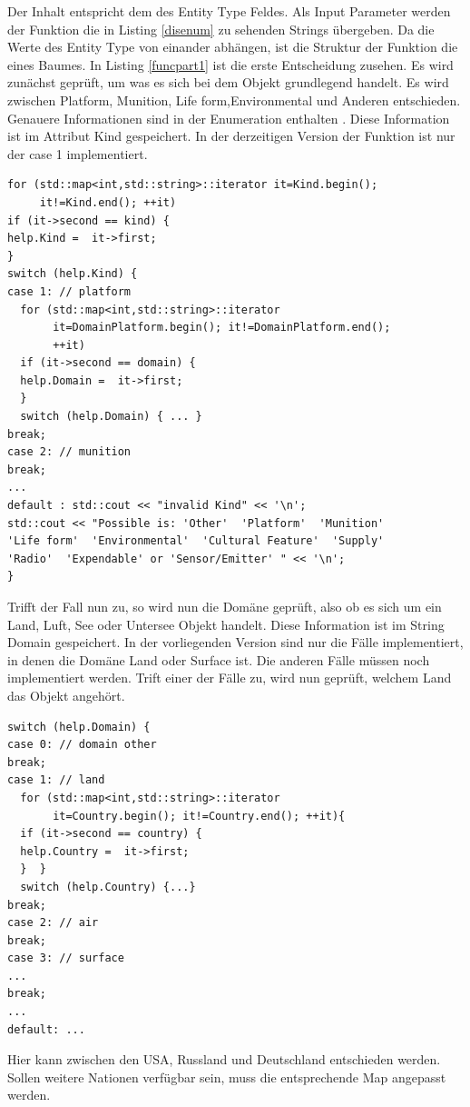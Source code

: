 Der Inhalt entspricht dem  des \glqq Entity Type\grqq{} Feldes. Als Input Parameter werden der Funktion die in Listing  \ref{disenum} zu sehenden Strings übergeben. Da die Werte des \glqq Entity Type\grqq{}  von einander abhängen, ist die Struktur der Funktion die eines Baumes.  In Listing \ref{funcpart1} ist die erste Entscheidung zusehen. Es wird zunächst geprüft, um was es sich bei dem Objekt grundlegend handelt. Es wird zwischen \glqq Platform\grqq{}, \glqq Munition\grqq{}, \glqq Life form\grqq{},\glqq Environmental\grqq{} und Anderen entschieden. Genauere Informationen sind in der Enumeration enthalten \cite{Shanks.}. Diese Information ist im Attribut \glqq Kind \grqq{} gespeichert. In der derzeitigen Version der Funktion ist nur der \glqq case 1\grqq{} implementiert. 
 \begin{lstlisting}[caption = Funktion \glqq getDISEntityType()\grqq{} Teil 1  ,label= funcpart1]
for (std::map<int,std::string>::iterator it=Kind.begin(); 
     it!=Kind.end(); ++it)
if (it->second == kind) {
help.Kind =  it->first;
}
switch (help.Kind) {
case 1: // platform
  for (std::map<int,std::string>::iterator 
       it=DomainPlatform.begin(); it!=DomainPlatform.end();
       ++it)
  if (it->second == domain) {
  help.Domain =  it->first;
  }
  switch (help.Domain) { ... }
break;
case 2: // munition
break;
...
default : std::cout << "invalid Kind" << '\n';
std::cout << "Possible is: 'Other'  'Platform'  'Munition'
'Life form'  'Environmental'  'Cultural Feature'  'Supply'
'Radio'  'Expendable' or 'Sensor/Emitter' " << '\n';
}
\end{lstlisting}
 Trifft der Fall nun zu, so wird nun die Domäne geprüft, also ob es sich um ein Land, Luft, See oder Untersee Objekt handelt. Diese Information ist im String \glqq Domain \grqq{} gespeichert. In der vorliegenden Version sind nur die Fälle implementiert, in denen die Domäne Land oder Surface ist. Die anderen Fälle müssen noch implementiert werden. Trift einer der Fälle zu, wird nun geprüft, welchem Land das Objekt angehört. 
 \begin{lstlisting}[caption = Funktion \glqq getDISEntityType()\grqq{} Teil 2  ,label= funcpart2]
switch (help.Domain) {
case 0: // domain other
break;
case 1: // land
  for (std::map<int,std::string>::iterator 
       it=Country.begin(); it!=Country.end(); ++it){
  if (it->second == country) {
  help.Country =  it->first;
  }  }
  switch (help.Country) {...}
break;
case 2: // air
break;
case 3: // surface
...
break;
...
default: ...
 \end{lstlisting}
 Hier kann zwischen den USA, Russland und Deutschland entschieden werden. Sollen weitere Nationen verfügbar sein, muss die entsprechende Map angepasst werden. 
